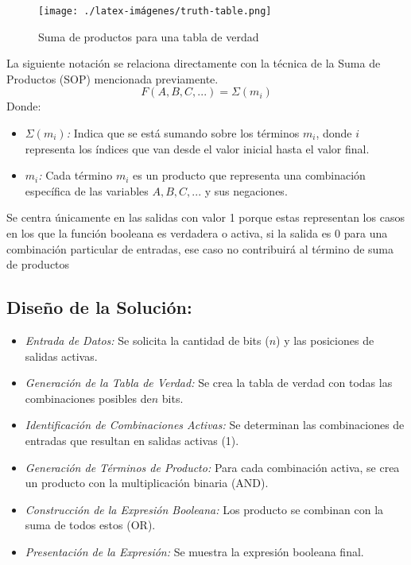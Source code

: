 \begin{figure}[h!]
    \centering
    \texttt{[image: ./latex-imágenes/truth-table.png]}
    \caption{Suma de productos para una tabla de verdad}
    \label{fig:enter-label}
\end{figure}
La siguiente notación se relaciona directamente con la técnica de la Suma de Productos (SOP) mencionada previamente.\\
\begin{equation}
    F(A, B, C, ...) = \Sigma(m_i)
    \label{eqn:SOPnotacionSigma}
\end{equation}
Donde:
\begin{itemize}

  \item[{\ieeeguilsinglright}] {\it \(\Sigma(m_i)\):} Indica que se está sumando sobre los términos \(m_i\), donde \(i\) representa los índices que van desde el valor inicial hasta el valor final.

  \item[{\ieeeguilsinglright}] {\it \(m_i\):} Cada término \(m_i\) es un producto que representa una combinación específica de las variables \(A, B, C, ...\) y sus negaciones.
\end{itemize}

Se centra únicamente en las salidas con valor 1 porque estas representan los casos en los que la función booleana es verdadera o activa, si la salida es 0 para una combinación particular de entradas, ese caso no contribuirá al término de suma de productos


\subsection{\textbf{Diseño de la Solución:}}

\begin{itemize}
    \item[{\ieeeguilsinglright}] {\it Entrada de Datos:}
        Se solicita la cantidad de bits (\(n\)) y las posiciones de salidas activas.
        
    \item[{\ieeeguilsinglright}] {\it Generación de la Tabla de Verdad:}
        Se crea la tabla de verdad con todas las combinaciones posibles de\(n\) bits.

    \item[{\ieeeguilsinglright}] {\it Identificación de Combinaciones Activas:}
        Se determinan las combinaciones de entradas que resultan en salidas activas (1).

    \item[{\ieeeguilsinglright}] {\it Generación de Términos de Producto:}
        Para cada combinación activa, se crea un producto con la multiplicación binaria (AND).

    \item[{\ieeeguilsinglright}] {\it Construcción de la Expresión Booleana:}
        Los producto se combinan con la suma de todos estos (OR).

    \item[{\ieeeguilsinglright}] {\it Presentación de la Expresión:}
         Se muestra la expresión booleana final.        
\end{itemize}
\newpage


